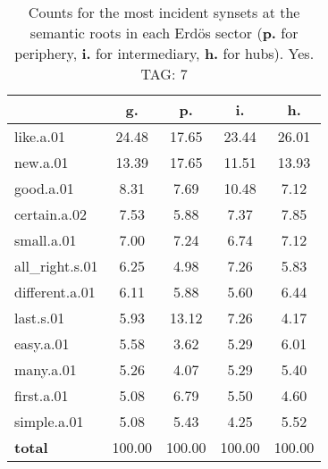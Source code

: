 \begin{table}[h!]
\begin{center}
\begin{tabular}{| l || c | c | c | c |}\hline
 & {\bf g.} & {\bf p.} & {\bf i.} & {\bf h.} \\\hline\hline
like.a.01 & 24.48  & 17.65  & 23.44  & 26.01 \\\hline
new.a.01 & 13.39  & 17.65  & 11.51  & 13.93 \\\hline
good.a.01 & 8.31  & 7.69  & 10.48  & 7.12 \\\hline
certain.a.02 & 7.53  & 5.88  & 7.37  & 7.85 \\\hline
small.a.01 & 7.00  & 7.24  & 6.74  & 7.12 \\\hline
all\_right.s.01 & 6.25  & 4.98  & 7.26  & 5.83 \\\hline
different.a.01 & 6.11  & 5.88  & 5.60  & 6.44 \\\hline
last.s.01 & 5.93  & 13.12  & 7.26  & 4.17 \\\hline
easy.a.01 & 5.58  & 3.62  & 5.29  & 6.01 \\\hline
many.a.01 & 5.26  & 4.07  & 5.29  & 5.40 \\\hline
first.a.01 & 5.08  & 6.79  & 5.50  & 4.60 \\\hline
simple.a.01 & 5.08  & 5.43  & 4.25  & 5.52 \\\hline\hline
{{\bf total}} & 100.00  & 100.00  & 100.00  & 100.00 \\\hline
\end{tabular}
\caption{Counts for the most incident synsets at the semantic roots in each Erd\"os sector ({\bf p.} for periphery, {\bf i.} for intermediary, {\bf h.} for hubs). Yes. TAG: 7}
\end{center}
\end{table}